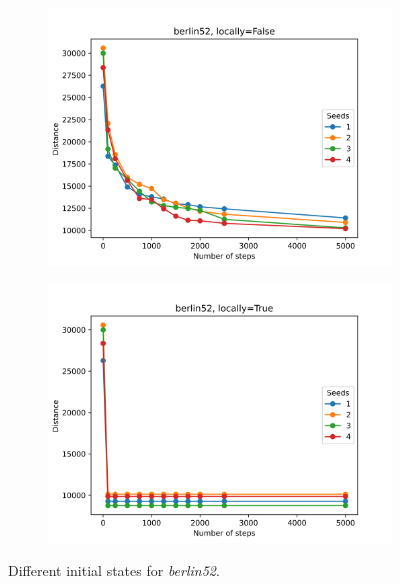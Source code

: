 \begin{figure}[!htb]
	\centering
	\begin{subfigure}{0.45\textwidth}
		\includegraphics[width=\textwidth]{img/berlin52_seeds_locally=False}
	\end{subfigure}
	\begin{subfigure}{0.45\textwidth}
		\includegraphics[width=\textwidth]{img/berlin52_seeds_locally=True}
	\end{subfigure}
	\caption{Different initial states for \textit{berlin52}.}
	\label{fig:berlin52_seeds}
\end{figure}
	
